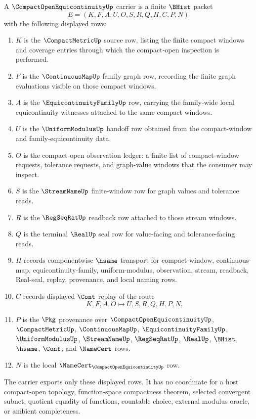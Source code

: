 \begin{definition}
\label{def:compact-open-equicontinuity-carrier}
A $\CompactOpenEquicontinuityUp$ carrier is a finite $\BHist$ packet
$$
E=(K,F,A,U,O,S,R,Q,H,C,P,N)
$$
with the following displayed rows:
\begin{enumerate}
\item $K$ is the $\CompactMetricUp$ source row, listing the finite compact windows and coverage entries through which the compact-open inspection is performed.
\item $F$ is the $\ContinuousMapUp$ family graph row, recording the finite graph evaluations visible on those compact windows.
\item $A$ is the $\EquicontinuityFamilyUp$ row, carrying the family-wide local equicontinuity witnesses attached to the same compact windows.
\item $U$ is the $\UniformModulusUp$ handoff row obtained from the compact-window and family-equicontinuity data.
\item $O$ is the compact-open observation ledger: a finite list of compact-window requests, tolerance requests, and graph-value windows that the consumer may inspect.
\item $S$ is the $\StreamNameUp$ finite-window row for graph values and tolerance reads.
\item $R$ is the $\RegSeqRatUp$ readback row attached to those stream windows.
\item $Q$ is the terminal $\RealUp$ seal row for value-facing and tolerance-facing reads.
\item $H$ records componentwise $\hsame$ transport for compact-window, continuous-map, equicontinuity-family, uniform-modulus, observation, stream, readback, Real-seal, replay, provenance, and local naming rows.
\item $C$ records displayed $\Cont$ replay of the route
$$
K,F,A,O \longmapsto U,S,R,Q,H,P,N .
$$
\item $P$ is the $\Pkg$ provenance over $\CompactOpenEquicontinuityUp$, $\CompactMetricUp$, $\ContinuousMapUp$, $\EquicontinuityFamilyUp$, $\UniformModulusUp$, $\StreamNameUp$, $\RegSeqRatUp$, $\RealUp$, $\BHist$, $\hsame$, $\Cont$, and $\NameCert$ rows.
\item $N$ is the local $\NameCert_{\CompactOpenEquicontinuityUp}$ row.
\end{enumerate}
The carrier exports only these displayed rows. It has no coordinate for a host compact-open topology, function-space compactness theorem, selected convergent subnet, quotient equality of functions, countable choice, external modulus oracle, or ambient completeness.
\end{definition}

